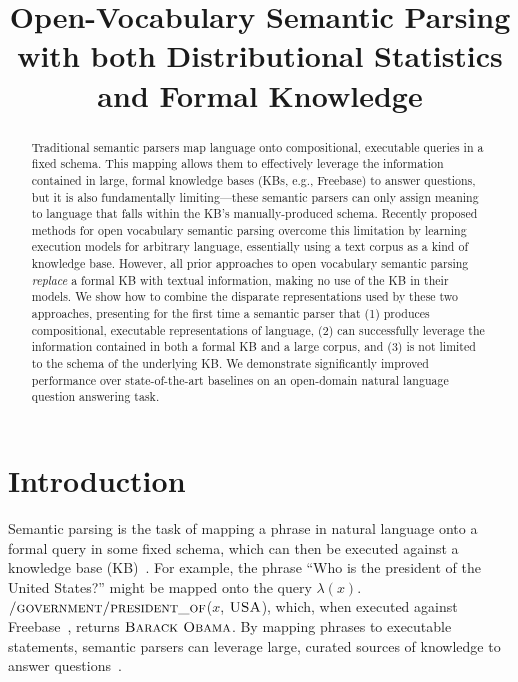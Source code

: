\documentclass[11pt,letterpaper]{article}
\title{Open-Vocabulary Semantic Parsing\\with both Distributional
Statistics and Formal Knowledge}
\author{}%
\date{}
\newcommand{\formalpredicate}[1]{{\small \ensuremath{\textsc{#1}}}}
\begin{document}
\maketitle

\begin{abstract}

  Traditional semantic parsers map language onto compositional, executable queries in a fixed
  schema.  This mapping allows them to effectively leverage the information contained in large,
  formal knowledge bases (KBs, e.g., Freebase) to answer questions, but it is also fundamentally
  limiting---these semantic parsers can only assign meaning to language that falls within the KB's
  manually-produced schema.  Recently proposed methods for open vocabulary semantic parsing
  overcome this limitation by learning execution models for arbitrary language, essentially using a
  text corpus as a kind of knowledge base.  However, all prior approaches to open vocabulary
  semantic parsing \emph{replace} a formal KB with textual information, making no use of the KB in
  their models.  We show how to combine the disparate representations used by these two approaches,
  presenting for the first time a semantic parser that (1) produces compositional, executable
  representations of language, (2) can successfully leverage the information contained in both a
  formal KB and a large corpus, and (3) is not limited to the schema of the underlying KB.  We
  demonstrate significantly improved performance over state-of-the-art baselines on an open-domain
  natural language question answering task.

\end{abstract}

\section{Introduction}

Semantic parsing is the task of mapping a phrase in natural language onto a formal query in some
fixed schema, which can then be executed against a knowledge
base (KB)~\cite{zelle-1996-geoquery,zettlemoyer-2005-ccg}.  For example, the phrase ``Who is the
president of the United States?'' might be mapped onto the query
$\lambda(x).$\formalpredicate{/government/president\_of}($x$, \formalpredicate{USA}), which, when
executed against Freebase~\cite{freebase-2008-bollacker}, returns \formalpredicate{Barack Obama}.
By mapping phrases to executable statements, semantic parsers can leverage large, curated sources
of knowledge to answer questions~\cite{berant-2013-semantic-parsing-qa}.
\end{document}
